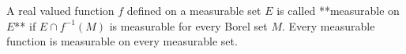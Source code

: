 A real valued function $f$ defined on a measurable set $E$ is called **measurable on $E$** if $E \cap f^{-1}(M)$ is measurable for every Borel set $M$. Every measurable function is measurable on every measurable set.
